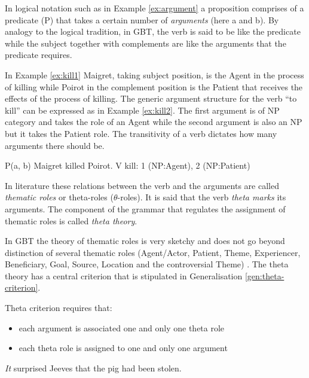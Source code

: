 In logical notation such as in Example \ref{ex:argument} a proposition comprises of a predicate (P) that takes a certain number of \textit{arguments} (here a and b). By analogy to the logical tradition, in GBT, the verb is said to be like the predicate while the subject together with complements are like the arguments that the predicate requires. 

In Example \ref{ex:kill1} Maigret, taking subject position, is the Agent in the process of killing while Poirot in the complement position is the Patient that receives the effects of the process of killing. The generic argument structure for the verb ``to kill'' can be expressed as in Example \ref{ex:kill2}. The first argument is of NP category and takes the role of an Agent while the second argument is also an NP but it takes the Patient role. The transitivity of a verb dictates how many arguments there should be.

\begin{exe}
    \ex\label{ex:argument} P(a, b)
    \ex\label{ex:kill1} Maigret killed Poirot.
    \ex\label{ex:kill2} V kill: 1 (NP:Agent), 2 (NP:Patient)
\end{exe}

In literature these relations between the verb and the arguments are called \textit{thematic roles} or theta-roles ($\theta$-roles). It is said that the verb \textit{theta marks} its arguments. The component of the grammar that regulates the assignment of thematic roles is called \textit{theta theory}. 

In GBT the theory of thematic roles is very sketchy and does not go beyond distinction of several thematic roles (Agent/Actor, Patient, Theme, Experiencer, Beneficiary, Goal, Source, Location and the controversial Theme) \citep[50]{Haegeman1991}. The theta theory has a central criterion that is stipulated in Generalisation \ref{gen:theta-criterion}.

\begin{generalization}\label{gen:gen:theta-criterion}
    Theta criterion requires that: 
    \begin{itemize}
        \item each argument is associated one and only one theta role
        \item each theta role is assigned to one and only one argument \citep[54]{Haegeman1991}
    \end{itemize} 
\end{generalization}

\begin{exe}
    \ex\label{ex:expletive1} \textit{It} surprised Jeeves that the pig had been stolen.
\end{exe}

